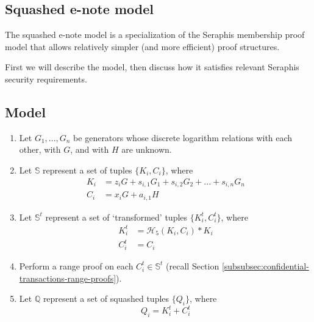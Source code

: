 \begin{appendices}

\renewcommand{\theFancyVerbLine}{%
	\textcolor{red}{\small
		\arabic{FancyVerbLine}}}

\section{Squashed e-note model}
\label{appendix:squashed-e-note-model}

The squashed e-note model is a specialization of the Seraphis membership proof model that allows relatively simpler (and more efficient) proof structures.

First we will describe the model, then discuss how it satisfies relevant Seraphis security requirements.


\subsection{Model}
\label{appendix:squashed-e-note-model-model}

\begin{enumerate}
    \item Let $G_1,...,G_n$ be generators whose discrete logarithm relations with each other, with $G$, and with $H$ are unknown.

    \item Let $\mathbb{S}$ represent a set of tuples $\{K_i, C_i\}$, where\vspace{.115cm}
    \begin{align*}
        K_i &= z_i G + s_{i,1} G_1 + s_{i,2} G_2 + ... + s_{i,n} G_n \\
        C_i &= x_i G + a_{i,1} H
    \end{align*}

    \item Let $\mathbb{S}^t$ represent a set of `transformed' tuples $\{K^t_i, C^t_i\}$, where\vspace{.115cm}
    \begin{align*}
        K^t_i &= \mathcal{H}_5(K_i, C_i)*K_i \\
        C^t_i &= C_i
    \end{align*}

    \item Perform a range proof on each $C^t_i \in \mathbb{S}^t$ (recall Section \ref{subsubsec:confidential-transactions-range-proofs}).

    \item Let $\mathbb{Q}$ represent a set of squashed tuples $\{Q_i\}$, where\vspace{.115cm}
    \[Q_i = K^t_i + C^t_i\]


\end{enumerate}
\end{appendices}
